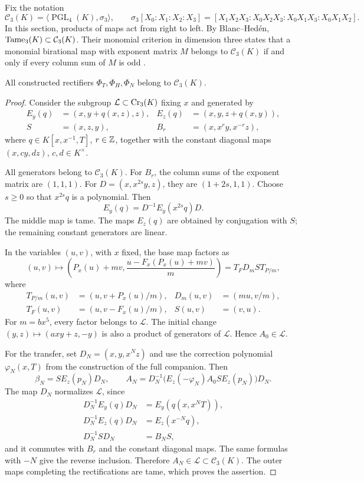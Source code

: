 Fix the notation
\[
 \mathcal C_3(K)=\langle\operatorname{PGL}_4(K),\sigma_3\rangle,
 \qquad
 \sigma_3[X_0:X_1:X_2:X_3]
 =[X_1X_2X_3:X_0X_2X_3:X_0X_1X_3:X_0X_1X_2].
\]
In this section, products of maps act from right to left.
By Blanc--Hed\'en, $\operatorname{Tame}_3(K)\subset\mathcal C_3(K)$.
Their monomial criterion in dimension three states that a monomial
birational map with exponent matrix $M$ belongs to $\mathcal C_3(K)$
if and only if every column sum of $M$ is odd
\cite[Theorem~1.1 and Proposition~6.5]{BH2015}.

\begin{proposition}\label{prop:cremona-membership}
All constructed rectifiers $\Phi_T,\Phi_H,\Phi_N$ belong to
$\mathcal C_3(K)$.
\end{proposition}
\begin{proof}
Consider the subgroup $\mathcal L\subset\operatorname{Cr}_3(K)$ fixing $x$ and
generated by
\[
 \begin{aligned}
 E_y(q)&=(x,y+q(x,z),z),& E_z(q)&=(x,y,z+q(x,y)),\\
 S&=(x,z,y),&B_r&=(x,x^ry,x^{-r}z),
 \end{aligned}
\]
where $q\in K[x,x^{-1},T]$, $r\in{\mathbb Z}$, together with the constant
diagonal maps $(x,cy,dz)$, $c,d\in K^\times$.

All generators belong to $\mathcal C_3(K)$.
For $B_r$, the column sums of the exponent matrix are $(1,1,1)$.
For $D=(x,x^{2s}y,z)$, they are $(1+2s,1,1)$.
Choose $s\ge0$ so that $x^{2s}q$ is a polynomial. Then
\[
 E_y(q)=D^{-1}E_y(x^{2s}q)D.
\]
The middle map is tame. The maps $E_z(q)$ are obtained by conjugation
with $S$; the remaining constant generators are linear.

In the variables $(u,v)$, with $x$ fixed, the base map factors as
\[
 (u,v)\longmapsto\left(P_x(u)+mv,
 \frac{u-F_x(P_x(u)+mv)}m\right)
 =T_FD_mST_{P/m},
\]
where
\[
 \begin{aligned}
 T_{P/m}(u,v)&=(u,v+P_x(u)/m),&D_m(u,v)&=(mu,v/m),\\
 T_F(u,v)&=(u,v-F_x(u)/m),&S(u,v)&=(v,u).
 \end{aligned}
\]
For $m=bx^5$, every factor belongs to $\mathcal L$.
The initial change $(y,z)\mapsto(axy+z,-y)$ is also a product of
generators of $\mathcal L$. Hence $A_0\in\mathcal L$.

For the transfer, set $D_N=(x,y,x^Nz)$ and use the correction polynomial
$\varphi_N(x,T)$ from the construction of the full companion. Then
\[
 \beta_N=SE_z(p_N)D_N,\qquad
 A_N=D_N^{-1}\bigl(E_z(-\varphi_N)A_0SE_z(p_N)\bigr)D_N.
\]
The map $D_N$ normalizes $\mathcal L$, since
\[
 \begin{aligned}
 D_N^{-1}E_y(q)D_N&=E_y(q(x,x^NT)),\\
 D_N^{-1}E_z(q)D_N&=E_z(x^{-N}q),\\
 D_N^{-1}SD_N&=B_NS,
 \end{aligned}
\]
and it commutes with $B_r$ and the constant diagonal maps.
The same formulas with $-N$ give the reverse inclusion.
Therefore $A_N\in\mathcal L\subset\mathcal C_3(K)$.
The outer maps completing the rectifications are tame, which proves
the assertion.
\end{proof}


